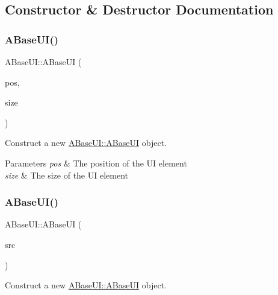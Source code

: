 \subsection{Constructor \& Destructor Documentation}
\mbox{\label{class_a_base_u_i_a643d80d189018a179d2e3a938e3aa539}} 
\subsubsection{\texorpdfstring{A\+Base\+U\+I()}{ABaseUI()}\hspace{0.1cm}{\footnotesize\ttfamily [1/2]}}
{\footnotesize\ttfamily A\+Base\+U\+I\+::\+A\+Base\+UI (\begin{DoxyParamCaption}\item[{glm\+::vec2}]{pos,  }\item[{glm\+::vec2}]{size }\end{DoxyParamCaption})}



Construct a new \hyperlink{class_a_base_u_i_a643d80d189018a179d2e3a938e3aa539}{A\+Base\+U\+I\+::\+A\+Base\+UI} object. 


\begin{DoxyParams}{Parameters}
{\em pos} & The position of the UI element \\
\hline
{\em size} & The size of the UI element \\
\hline
\end{DoxyParams}
\mbox{\label{class_a_base_u_i_a43914df26b12e74becb41da8d85448f1}} 
\subsubsection{\texorpdfstring{A\+Base\+U\+I()}{ABaseUI()}\hspace{0.1cm}{\footnotesize\ttfamily [2/2]}}
{\footnotesize\ttfamily A\+Base\+U\+I\+::\+A\+Base\+UI (\begin{DoxyParamCaption}\item[{\hyperlink{class_a_base_u_i}{A\+Base\+UI} const \&}]{src }\end{DoxyParamCaption})}



Construct a new \hyperlink{class_a_base_u_i_a643d80d189018a179d2e3a938e3aa539}{A\+Base\+U\+I\+::\+A\+Base\+UI} object. 


